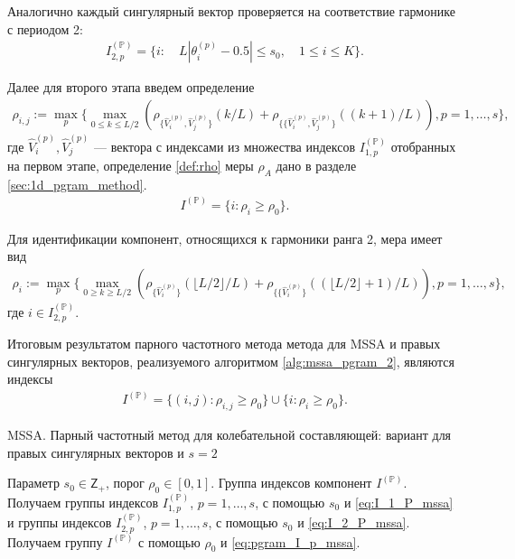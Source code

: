 \documentclass[specialist,
               substylefile = spbu.rtx,
               subf,href,colorlinks=true, 12pt]{disser}
\begin{document}
Аналогично каждый сингулярный вектор проверяется на соответствие гармонике с периодом 2:
\begin{gather} \label{eq:I_2_P_mssa}
I_{2,p}^{(\mathbb{P})} = \{i: \quad  L |\theta_{i}^{(p)} - 0.5 | \leqslant s_0, \quad 1 \leqslant i \leqslant K  \}.
\end{gather}

Далее для второго этапа введем определение
\begin{gather*}
\rho_{i,j} :=  \max_p \{ \max_{0 \leqslant k \leqslant L/2}{\left(\rho_{\{\widehat{V}_i^{(p)}, \widehat{V}_{j}^{(p)}\}}(k/L) + \rho_{\{\{\widehat{V}_i^{(p)}, \widehat{V}_{j}^{(p)}\}}((k+1)/L)\right)}, p=1,\ldots, s
 \},
\end{gather*}
где $\widehat{V}_i^{(p)}, \widehat{V}_{j}^{(p)}$ --- вектора с индексами из множества индексов $I_{1,p}^{(\mathbb{P})}$ отобранных на первом этапе,
определение \ref{def:rho} меры $\rho_A$ дано в разделе \ref{sec:1d_pgram_method}.
\begin{gather} \label{eq:pgram_I_p_mssa}
I^{(\mathbb{P})} = \{ i: \rho_{i} \geqslant\rho_0 \}.
\end{gather}

Для идентификации компонент, относящихся к гармоники ранга 2, мера имеет вид
\begin{gather*}
\rho_{i} :=  \max_p \{ \max_{0 \geqslant k \geqslant L/2}{\left(\rho_{\{\widehat{V}_i^{(p)}\}}(\lfloor L/2 \rfloor/L) + \rho_{\{\{\widehat{V}_i^{(p)}\}}((\lfloor L/2 \rfloor + 1)/L)\right)}, p=1,\ldots, s
 \},
\end{gather*}
где $i \in I_{2,p}^{(\mathbb{P})}$.

Итоговым результатом парного частотного метода метода для MSSA и правых сингулярных векторов, реализуемого алгоритмом \ref{alg:mssa_pgram_2}, являются индексы 
\begin{gather} \label{eq:pgram_I_p_mssa}
I^{(\mathbb{P})} = \{ (i,j): \rho_{i,j} \geqslant\rho_0 \} \cup \{ i: \rho_{i} \geqslant\rho_0 \}.
\end{gather}


\begin{algorithm}[!hhh]
\caption{MSSA. Парный частотный метод для колебательной составляющей: вариант для правых сингулярных векторов и $s=2$}
\label{alg:mssa_pgram_2}
\begin{algorithmic}[1]
\REQUIRE Параметр $s_0 \in \mathsf{Z}_{+}$, порог $\rho_0 \in [0,1]$.
\ENSURE Группа индексов компонент $I^{(\mathbb{P})}$.
\STATE  Получаем группы индексов $I_{1,p}^{(\mathbb{P})}$, $p=1,\ldots,s$, с помощью $s_0$ и \eqref{eq:I_1_P_mssa} и группы индексов $I_{2,p}^{(\mathbb{P})}$, $p=1,\ldots,s$, с помощью $s_0$ и \eqref{eq:I_2_P_mssa}.
\STATE Получаем группу $I^{(\mathbb{P})}$ с помощью $\rho_0$ и \eqref{eq:pgram_I_p_mssa}.
\end{algorithmic}
\end{algorithm}
\end{document}
